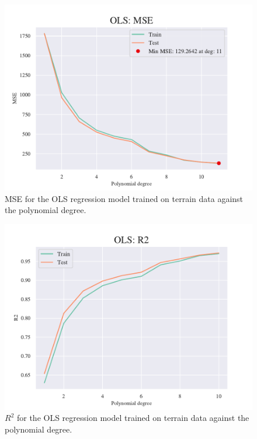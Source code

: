 \begin{figure}[H]
    \centering
    \includegraphics[width=1\linewidth]{project_1/figures/figures_in_appendix/OLS_MSE_terrain.pdf}
    \caption{MSE for the OLS regression model trained on terrain data against the polynomial degree.}
    \label{fig:ref7}
\end{figure}

\begin{figure}[H]
    \centering
    \includegraphics[width=1\linewidth]{project_1/figures/figures_in_appendix/OLS_R2_terrain.pdf}
    \caption{$R^2$ for the OLS regression model trained on terrain data against the polynomial degree.}
    \label{fig:ref8}
\end{figure}



